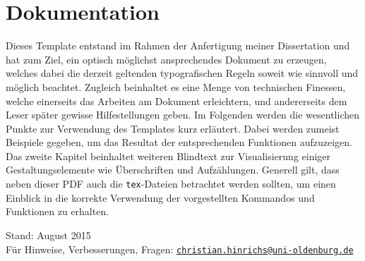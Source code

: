 %
\ifx\fulldocument\undefined
  
  \pagestyle{scrheadings}                                                       %
\fi
%
%
%
\chapter{Dokumentation}\label{sec:dokumentation}
%
Dieses Template entstand im Rahmen der Anfertigung meiner Dissertation \cite{Hinrichs2014} und hat zum Ziel, ein optisch möglichst ansprechendes Dokument zu erzeugen, welches dabei die derzeit geltenden typografischen Regeln soweit wie sinnvoll und möglich beachtet. Zugleich beinhaltet es eine Menge von technischen Finessen, welche einerseits das Arbeiten am Dokument erleichtern, und andererseits dem Leser später gewisse Hilfestellungen geben. Im Folgenden werden die wesentlichen Punkte zur Verwendung des Templates kurz erläutert. Dabei werden zumeist Beispiele gegeben, um das Resultat der entsprechenden Funktionen aufzuzeigen. Das zweite Kapitel beinhaltet weiteren Blindtext zur Visualisierung einiger Gestaltungselemente wie Überschriften und Aufzählungen. Generell gilt, dass neben dieser PDF auch die \texttt{tex}-Dateien betrachtet werden sollten, um einen Einblick in die korrekte Verwendung der vorgestellten Kommandos und Funktionen zu erhalten.
%
\\\par\noindent Stand: August 2015\\
Für Hinweise, Verbesserungen, Fragen: \href{mailto:christian.hinrichs@uni-oldenburg.de}{\nolinkurl{christian.hinrichs@uni-oldenburg.de}}
%
